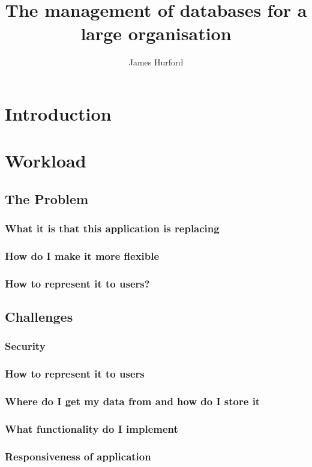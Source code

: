 \documentclass[12pt]{article}
\title{The management of databases for a large organisation}
\author{James Hurford}
\begin{document}
\maketitle
\setcounter{tocdepth}{3}
\tableofcontents
\vspace*{1cm}

\section{Introduction}


\section{Workload}
\subsection{The Problem}
\subsubsection{What it is that this application is replacing}
\subsubsection{How do I make it more flexible}
\subsubsection{How to represent it to users?}
\subsection{Challenges}
\subsubsection{Security}
\subsubsection{How to represent it to users}
\subsubsection{Where do I get my data from and how do I store it}
\subsubsection{What functionality do I implement}
\subsubsection{Responsiveness of application}
\end{document}
